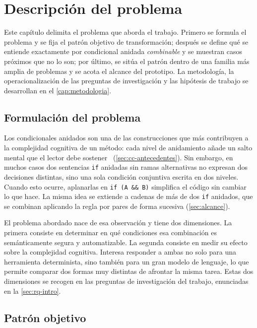 \chapter{Descripción del problema}
\label{cap:problema}

Este capítulo delimita el problema que aborda el trabajo. Primero se formula
el problema y se fija el patrón objetivo de transformación; después se define
qué se entiende exactamente por condicional anidada \emph{combinable} y se
muestran casos próximos que no lo son; por último, se sitúa el patrón dentro
de una familia más amplia de problemas y se acota el alcance del prototipo.
La metodología, la operacionalización de las preguntas de investigación y las
hipótesis de trabajo se desarrollan en el \autoref{cap:metodologia}.

\section{Formulación del problema}
\label{sec:formulacion}

Los condicionales anidados son una de las construcciones que más contribuyen
a la complejidad cognitiva de un método: cada nivel de anidamiento añade un
salto mental que el lector debe sostener~\cite{10.1145/3194164.3194186}
(\autoref{sec:cc-antecedentes}). Sin embargo, en muchos casos dos sentencias
\lstinline|if| anidadas sin ramas alternativas no expresan dos decisiones
distintas, sino una sola condición conjuntiva escrita en dos niveles. Cuando
esto ocurre, aplanarlas en \lstinline|if (A && B)| simplifica el código sin
cambiar lo que hace. La misma idea se extiende a cadenas de más de dos
\lstinline|if| anidados, que se combinan aplicando la regla por pares de forma
sucesiva (\autoref{sec:alcance}).

El problema abordado nace de esa observación y tiene dos dimensiones. La
primera consiste en determinar en qué condiciones esa combinación es
semánticamente segura y automatizable. La segunda consiste en medir su efecto
sobre la complejidad cognitiva. Interesa responder a ambas no solo para una
herramienta determinista, sino también para un gran modelo de lenguaje, lo
que permite comparar dos formas muy distintas de afrontar la misma tarea.
Estas dos dimensiones se recogen en las preguntas de investigación del
trabajo, enunciadas en la \autoref{sec:rq-intro}.

\section{Patrón objetivo}
\label{sec:patron}

